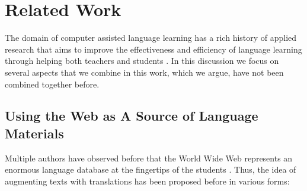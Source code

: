 \section{Related Work}

The domain of computer assisted language learning has a rich history of applied research that aims to improve the effectiveness and efficiency of language learning through helping both teachers and students \cite{levy2013call}. In this discussion we focus on several aspects that we combine in this work, which we argue, have not been combined together before.


\subsection{Using the Web as A Source of Language Materials}

Multiple authors have observed before that the World Wide Web represents an enormous language database at the fingertips of the students \cite{Fried08-Learner,Hira07-WebCorpora}. 
Thus, the idea of augmenting texts with translations has been proposed before in various forms: 

